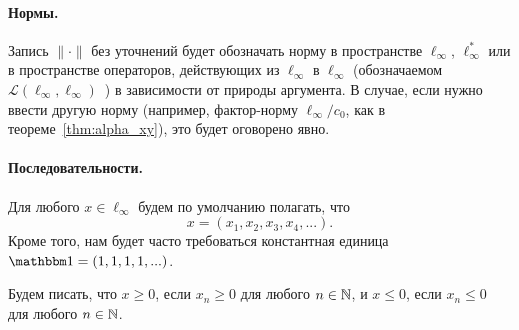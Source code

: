 \paragraph{Нормы.}
Запись $\|\cdot\|$ без уточнений будет обозначать норму в пространстве $\ell_\infty$, $\ell_\infty^*$
или в пространстве операторов, действующих из $\ell_\infty$ в $\ell_\infty$ (обозначаемом $\mathcal L (\ell_\infty, \ell_\infty)$~)
в зависимости от природы аргумента.
В случае, если нужно ввести другую норму (например, фактор-норму $\ell_\infty / c_0$, как в теореме~\ref{thm:alpha_xy}),
это будет оговорено явно.


\paragraph{Последовательности.}
Для любого $x\in\ell_\infty$ будем по умолчанию полагать, что
\begin{equation}
	x=(x_1, x_2, x_3, x_4, ...)
	.
\end{equation}
Кроме того, нам будет часто требоваться константная единица $\one = (1, 1, 1, 1, ...)$.

Будем писать, что $x\geq 0$, если $x_n \geq 0$ для любого $n\in \mathbb{N}$, и $x\leq 0$, если $x_n \leq 0$ для любого $n\in \mathbb{N}$.

